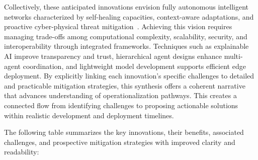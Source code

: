 \documentclass[sigconf]{acmart}
\begin{document}
Collectively, these anticipated innovations envision fully autonomous intelligent networks characterized by self-healing capacities, context-aware adaptations, and proactive cyber-physical threat mitigation~\cite{ref55}. Achieving this vision requires managing trade-offs among computational complexity, scalability, security, and interoperability through integrated frameworks. Techniques such as explainable AI improve transparency and trust, hierarchical agent designs enhance multi-agent coordination, and lightweight model development supports efficient edge deployment. By explicitly linking each innovation’s specific challenges to detailed and practicable mitigation strategies, this synthesis offers a coherent narrative that advances understanding of operationalization pathways. This creates a connected flow from identifying challenges to proposing actionable solutions within realistic development and deployment timelines.

\bigskip

The following table summarizes the key innovations, their benefits, associated challenges, and prospective mitigation strategies with improved clarity and readability:
\end{document}

